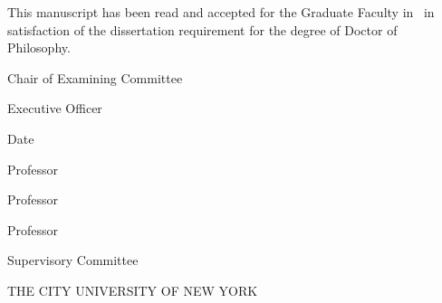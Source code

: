 \clearpage\thispagestyle{empty}
\begin{vplace}
\begin{SingleSpace}

\centering

\noindent This manuscript has been read and accepted for the Graduate Faculty
in \MyDiscipline\ in satisfaction of the dissertation requirement for the
degree of Doctor of Philosophy.

\vskip 1in
\flushleft

\hrulefill
\newline
\AdviserName
\newline
Chair of Examining Committee
\vspace{0.5in}

\hrulefill
\newline
\EOName
\newline
Executive Officer
\vspace{0.5in}

\hrulefill
\newline
Date
\vspace{0.5in}
\newline

Professor \FirstCommitteeMember \\
\hrulefill

Professor \SecondCommitteeMember \\
\hrulefill

Professor \ThirdCommitteeMember \\
\hrulefill

Supervisory Committee

\vskip 1in
\centering

\MakeUppercase{The City University of New York}

\end{SingleSpace}
\end{vplace}
